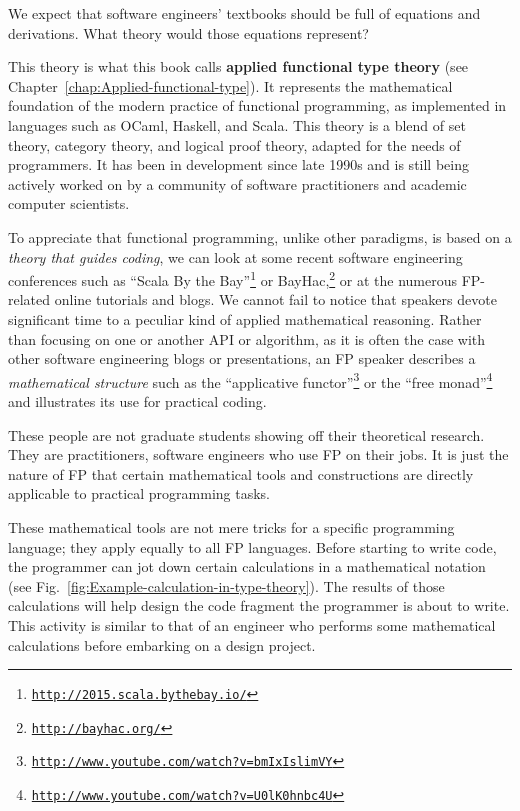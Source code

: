 We expect that software engineers\textsf{'} textbooks should be full
of equations and derivations. What theory would those equations represent?

This theory is what this book calls \textbf{applied functional type
theory} (see Chapter~\ref{chap:Applied-functional-type}).
It represents the mathematical foundation of the modern practice of
functional programming, as implemented in languages such as OCaml,
Haskell, and Scala. This theory is a blend of set theory, category
theory, and logical proof theory, adapted for the needs of programmers.
It has been in development since late 1990s and is still being actively
worked on by a community of software practitioners and academic computer
scientists.

To appreciate that functional programming, unlike other paradigms,
is based on a \emph{theory that guides coding}, we can look at some
recent software engineering conferences such as \textsf{``}Scala By the Bay\textsf{''}\footnote{\texttt{\href{http://2015.scala.bythebay.io/}{http://2015.scala.bythebay.io/}}}
or BayHac,\footnote{\texttt{\href{http://bayhac.org/}{http://bayhac.org/}}}
or at the numerous FP-related online tutorials and blogs. We cannot
fail to notice that speakers devote significant time to a peculiar
kind of applied mathematical reasoning. Rather than focusing on one
or another API or algorithm, as it is often the case with other software
engineering blogs or presentations, an FP speaker describes a \emph{mathematical
structure} \textemdash{} such as the \textsf{``}applicative functor\textsf{''}\footnote{\texttt{\href{http://www.youtube.com/watch?v=bmIxIslimVY}{http://www.youtube.com/watch?v=bmIxIslimVY}}}
or the \textsf{``}free monad\textsf{''}\footnote{\texttt{\href{http://www.youtube.com/watch?v=U0lK0hnbc4U}{http://www.youtube.com/watch?v=U0lK0hnbc4U}}}
\textemdash{} and illustrates its use for practical coding.

These people are not graduate students showing off their theoretical
research. They are practitioners, software engineers who use FP on
their jobs. It is just the nature of FP that certain mathematical
tools and constructions are directly applicable to practical programming
tasks.

These mathematical tools are not mere tricks for a specific programming
language; they apply equally to all FP languages. Before starting
to write code, the programmer can jot down certain calculations in
a mathematical notation (see Fig.\ \ref{fig:Example-calculation-in-type-theory}).
The results of those calculations will help design the code fragment
the programmer is about to write. This activity is similar to that
of an engineer who performs some mathematical calculations before
embarking on a design project. 

